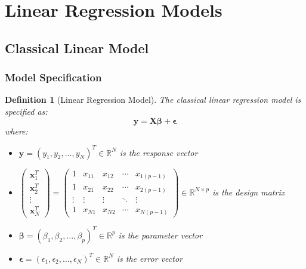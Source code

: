 \documentclass{article}
\newtheorem{definition}{Definition}
\begin{document}
\section{Linear Regression Models}

\subsection{Classical Linear Model}

\subsubsection{Model Specification}

\begin{definition}[Linear Regression Model]
The classical linear regression model is specified as:
\begin{equation}
\mathbf{y} = \mathbf{X}\boldsymbol{\beta} + \boldsymbol{\epsilon}
\end{equation}
where:
\begin{itemize}
    \item $\mathbf{y} = (y_1, y_2, \ldots, y_N)^T \in \mathbb{R}^N$ is the response vector
    \item $\begin{pmatrix}
        \mathbf{x}_1^T \\
        \mathbf{x}_2^T \\
        \vdots \\
        \mathbf{x}_N^T
    \end{pmatrix} = \begin{pmatrix}
        1 & x_{11} & x_{12} & \cdots & x_{1(p-1)} \\
        1 & x_{21} & x_{22} & \cdots & x_{2(p-1)} \\
        \vdots & \vdots & \vdots & \ddots & \vdots \\
        1 & x_{N1} & x_{N2} & \cdots & x_{N(p-1)}
    \end{pmatrix} \in \mathbb{R}^{N \times p}$ is the design matrix
    \item $\boldsymbol{\beta} = (\beta_1, \beta_2, \ldots, \beta_p)^T \in \mathbb{R}^p$ is the parameter vector
    \item $\boldsymbol{\epsilon} = (\epsilon_1, \epsilon_2, \ldots, \epsilon_N)^T \in \mathbb{R}^N$ is the error vector
\end{itemize}



    
\end{definition}
\end{document}
